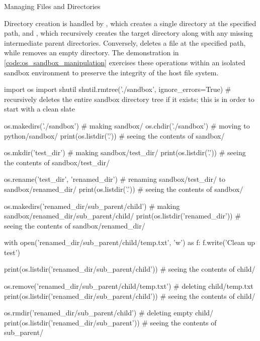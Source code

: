 \documentclass[10pt]{article}
\begin{document}
    \begin{core}{Managing Files and Directories}

      Directory creation is handled by , which creates a single directory at the specified path, and , which recursively creates the target directory along with any missing intermediate parent directories. Conversely,  deletes a file at the specified path, while  removes an empty directory. The demonstration in \autoref{code:os_sandbox_manipulation} exercises these operations within an isolated sandbox environment to preserve the integrity of the host file system.

      \begin{pyconsole}

        import os
        import shutil
        shutil.rmtree('./sandbox', ignore_errors=True) # recursively deletes the entire sandbox directory tree if it exists; this is in order to start with a clean slate

        os.makedirs('./sandbox') # making sandbox/
        os.chdir('./sandbox') # moving to python/sandbox/
        print(os.listdir('.')) # seeing the contents of sandbox/

        os.mkdir('test_dir') # making sandbox/test_dir/
        print(os.listdir('.')) # seeing the contents of sandbox/test_dir/

        os.rename('test_dir', 'renamed_dir') # renaming sandbox/test_dir/ to sandbox/renamed_dir/
        print(os.listdir('.')) # seeing the contents of sandbox/

        os.makedirs('renamed_dir/sub_parent/child') # making sandbox/renamed_dir/sub_parent/child/
        print(os.listdir('renamed_dir')) # seeing the contents of sandbox/renamed_dir/

        with open('renamed_dir/sub_parent/child/temp.txt', 'w') as f:
            f.write('Clean up test')

        print(os.listdir('renamed_dir/sub_parent/child')) # seeing the contents of child/

        os.remove('renamed_dir/sub_parent/child/temp.txt') # deleting child/temp.txt
        print(os.listdir('renamed_dir/sub_parent/child')) # seeing the contents of child/

        os.rmdir('renamed_dir/sub_parent/child') # deleting empty child/
        print(os.listdir('renamed_dir/sub_parent')) # seeing the contents of sub_parent/


\end{pyconsole}
\end{core}
\end{document}

